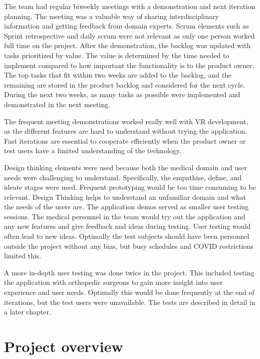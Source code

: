 \documentclass[a4paper]{report}
\begin{document}
The team had regular biweekly meetings with a demonstration and next iteration planning. The meeting was a valuable way of sharing interdisciplinary information and getting feedback from domain experts. Scrum elements such as Sprint retrospective and daily scrum were not relevant as only one person worked full time on the project.
After the demonstration, the backlog was updated with tasks prioritized by value. The value is determined by the time needed to implement compared to how important the functionality is to the product owner. The top tasks that fit within two weeks are added to the backlog, and the remaining are stored in the product backlog and considered for the next cycle.
During the next two weeks, as many tasks as possible were implemented and demonstrated in the next meeting.

The frequent meeting demonstrations worked really well with VR development, as the different features are hard to understand without trying the application. Fast iterations are essential to cooperate efficiently when the product owner or test users have a limited understanding of the technology.

Design thinking elements were used because both the medical domain and user needs were challenging to understand. Specifically, the empathise, define, and ideate stages were used. Frequent prototyping would be too time consuming to be relevant. Design Thinking helps to understand an unfamiliar domain and what the needs of the users are.
The application demos served as smaller user testing sessions. The medical personnel in the team would try out the application and any new features and give feedback and ideas during testing. User testing would often lead to new ideas. Optimally the test subjects should have been personnel outside the project without any bias, but busy schedules and COVID restrictions limited this.

A more in-depth user testing was done twice in the project. This included testing the application with orthopedic surgeons to gain more insight into user experience and user needs. Optimally this would be done frequently at the end of iterations, but the test users were unavailable. The tests are described in detail in a later chapter.

\section{Project overview}\label{CodeStructure}
\end{document}

